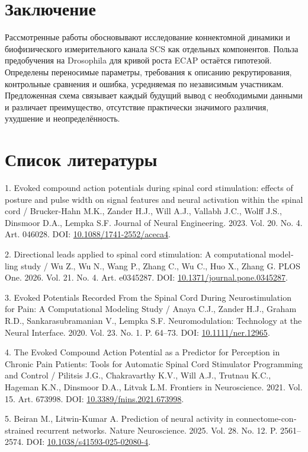 \documentclass[12pt,a4paper]{article}
\begin{document}
\section*{Заключение}
Рассмотренные работы обосновывают исследование коннектомной динамики и биофизического измерительного канала SCS как отдельных компонентов. Польза предобучения на Drosophila для кривой роста ECAP остаётся гипотезой. Определены переносимые параметры, требования к описанию рекрутирования, контрольные сравнения и ошибка, усредняемая по независимым участникам. Предложенная схема связывает каждый будущий вывод с необходимыми данными и различает преимущество, отсутствие практически значимого различия, ухудшение и неопределённость.\par
\section*{Список литературы}
\noindent\foreignlanguage{english}{1. Evoked compound action potentials during spinal cord stimulation: effects of posture and pulse width on signal features and neural activation within the spinal cord / Brucker-Hahn M.K., Zander H.J., Will A.J., Vallabh J.C., Wolff J.S., Dinsmoor D.A., Lempka S.F. Journal of Neural Engineering. 2023. Vol. 20. No. 4. Art. 046028. DOI: \url{10.1088/1741-2552/aceca4}.}\par
\noindent\foreignlanguage{english}{2. Directional leads applied to spinal cord stimulation: A computational modelling study / Wu Z., Wu N., Wang P., Zhang C., Wu C., Huo X., Zhang G. PLOS One. 2026. Vol. 21. No. 4. Art. e0345287. DOI: \url{10.1371/journal.pone.0345287}.}\par
\noindent\foreignlanguage{english}{3. Evoked Potentials Recorded From the Spinal Cord During Neurostimulation for Pain: A Computational Modeling Study / Anaya C.J., Zander H.J., Graham R.D., Sankarasubramanian V., Lempka S.F. Neuromodulation: Technology at the Neural Interface. 2020. Vol. 23. No. 1. P. 64–73. DOI: \url{10.1111/ner.12965}.}\par
\noindent\foreignlanguage{english}{4. The Evoked Compound Action Potential as a Predictor for Perception in Chronic Pain Patients: Tools for Automatic Spinal Cord Stimulator Programming and Control / Pilitsis J.G., Chakravarthy K.V., Will A.J., Trutnau K.C., Hageman K.N., Dinsmoor D.A., Litvak L.M. Frontiers in Neuroscience. 2021. Vol. 15. Art. 673998. DOI: \url{10.3389/fnins.2021.673998}.}\par
\noindent\foreignlanguage{english}{5. Beiran M., Litwin-Kumar A. Prediction of neural activity in connectome-constrained recurrent networks. Nature Neuroscience. 2025. Vol. 28. No. 12. P. 2561–2574. DOI: \url{10.1038/s41593-025-02080-4}.}\par
\end{document}
